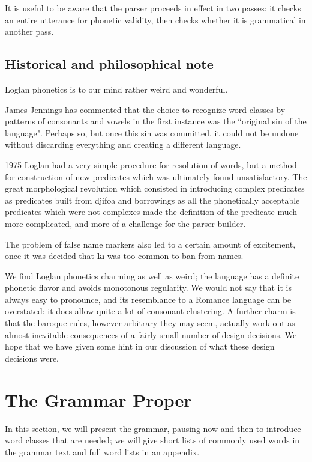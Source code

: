 \documentclass[12pt]{book}
\begin{document}
{It is useful to be aware that the parser proceeds in effect in two passes:  it checks an entire utterance for phonetic validity, then checks whether it is grammatical in another pass.

\section{Historical and philosophical note}

Loglan phonetics is to our mind rather weird and wonderful.

James Jennings has commented that the choice to recognize word classes by patterns of consonants and vowels in the first instance was the ``original sin of the language".  Perhaps so, but once this sin was committed, it could not be undone without discarding everything and creating a different language.

1975 Loglan had a very simple procedure for resolution of words, but a method for construction of new predicates which was ultimately found unsatisfactory.  The great morphological revolution which consisted in introducing complex predicates as predicates built from djifoa and borrowings as all the phonetically acceptable predicates which were not complexes made the definition of the predicate much more complicated, and more of a challenge for the parser builder.

The problem of false name markers also led to a certain amount of excitement, once it was decided that {\bf la} was too common to ban from names.

We find Loglan phonetics charming as well as weird;  the language has a definite phonetic flavor and avoids monotonous regularity.  We would not say that it is always easy to pronounce, and its resemblance to a Romance language can be overstated:  it does allow quite a lot of consonant clustering.  A further charm is that the baroque rules, however arbitrary they may seem, actually work out as almost inevitable consequences of a fairly small number of design decisions.  We hope that we have given some hint in our discussion of what these design decisions were.

\chapter{The Grammar Proper}

In this section, we will present the grammar, pausing now and then to introduce word classes that are needed;  we will give short lists of commonly used words in the grammar text and full word lists in an appendix.

}
\end{document}
